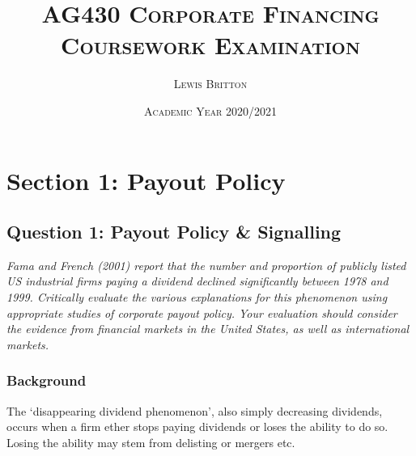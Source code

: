 \documentclass[11pt, english]{article}
\begin{document}

        \title{\textsc{AG430 Corporate Financing\\ Coursework Examination}}
        \author{\textsc{Lewis Britton}}
        \date{\textsc{Academic Year 2020/2021}}
        \maketitle

\newpage


        \renewcommand{\contentsname}{Table of Contents} 

	\tableofcontents

\newpage


\section{Section 1: Payout Policy}

	\subsection{Question 1: Payout Policy \& Signalling}

	\textit{Fama and French (2001) report that the number and proportion of publicly listed US industrial firms paying a dividend declined significantly between 1978 and 1999. Critically evaluate the various explanations for this phenomenon using appropriate studies of corporate payout policy. Your evaluation should consider the evidence from financial markets in the United States, as well as international markets.}

		\subsubsection*{Background}

	The `disappearing dividend phenomenon', also simply decreasing dividends, occurs when a firm ether stops paying dividends or loses the ability to do so. Losing the ability may stem from delisting or mergers etc.\\
\end{document}
